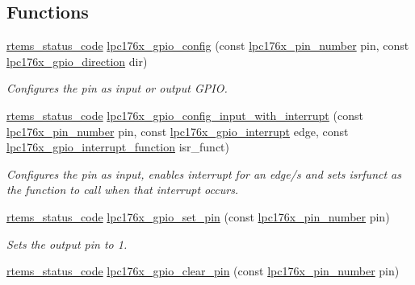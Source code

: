 \subsection*{Functions}
\begin{DoxyCompactItemize}
\item 
\mbox{\hyperlink{group__ClassicStatus_ga545d41846817eaba6143d52ee4d9e9fe}{rtems\+\_\+status\+\_\+code}} \mbox{\hyperlink{lpc-gpio_8c_a7a76b077d3ffba00d57d0b9b7ede28f2}{lpc176x\+\_\+gpio\+\_\+config}} (const \mbox{\hyperlink{common-types_8h_a8215ced1557c43bc5925b691a3c1dc23}{lpc176x\+\_\+pin\+\_\+number}} pin, const \mbox{\hyperlink{gpio-defs_8h_a0c9e959ab33ca3965f03caf07c8ecc17}{lpc176x\+\_\+gpio\+\_\+direction}} dir)
\begin{DoxyCompactList}\small\item\em Configures the pin as input or output G\+P\+IO. \end{DoxyCompactList}\item 
\mbox{\hyperlink{group__ClassicStatus_ga545d41846817eaba6143d52ee4d9e9fe}{rtems\+\_\+status\+\_\+code}} \mbox{\hyperlink{lpc-gpio_8c_a94a3ba04eb2443625898f44b797acdfe}{lpc176x\+\_\+gpio\+\_\+config\+\_\+input\+\_\+with\+\_\+interrupt}} (const \mbox{\hyperlink{common-types_8h_a8215ced1557c43bc5925b691a3c1dc23}{lpc176x\+\_\+pin\+\_\+number}} pin, const \mbox{\hyperlink{gpio-defs_8h_afc30bf25b9862f6272f1bab077f8016b}{lpc176x\+\_\+gpio\+\_\+interrupt}} edge, const \mbox{\hyperlink{gpio-defs_8h_aee89c4be418a21db878253cdf558ecc5}{lpc176x\+\_\+gpio\+\_\+interrupt\+\_\+function}} isr\+\_\+funct)
\begin{DoxyCompactList}\small\item\em Configures the pin as input, enables interrupt for an edge/s and sets isrfunct as the function to call when that interrupt occurs. \end{DoxyCompactList}\item 
\mbox{\hyperlink{group__ClassicStatus_ga545d41846817eaba6143d52ee4d9e9fe}{rtems\+\_\+status\+\_\+code}} \mbox{\hyperlink{lpc-gpio_8c_ac96e0713a459b1581759133a858ebc73}{lpc176x\+\_\+gpio\+\_\+set\+\_\+pin}} (const \mbox{\hyperlink{common-types_8h_a8215ced1557c43bc5925b691a3c1dc23}{lpc176x\+\_\+pin\+\_\+number}} pin)
\begin{DoxyCompactList}\small\item\em Sets the output pin to 1. \end{DoxyCompactList}\item 
\mbox{\hyperlink{group__ClassicStatus_ga545d41846817eaba6143d52ee4d9e9fe}{rtems\+\_\+status\+\_\+code}} \mbox{\hyperlink{lpc-gpio_8c_a5bae3a3990dd0e2fe8769c2221130c70}{lpc176x\+\_\+gpio\+\_\+clear\+\_\+pin}} (const \mbox{\hyperlink{common-types_8h_a8215ced1557c43bc5925b691a3c1dc23}{lpc176x\+\_\+pin\+\_\+number}} pin)

\end{DoxyCompactItemize}
